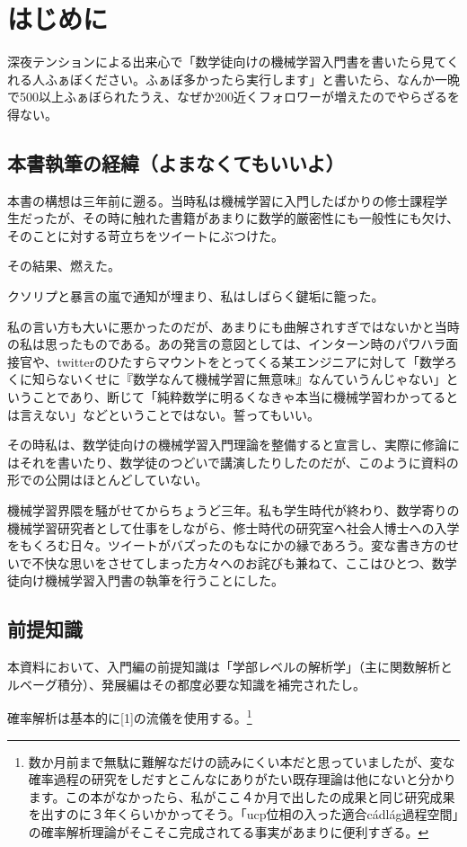 \documentclass{jsarticle}
\begin{document}
\newpage
\section{はじめに}

深夜テンションによる出来心で「数学徒向けの機械学習入門書を書いたら見てくれる人ふぁぼください。ふぁぼ多かったら実行します」と書いたら、なんか一晩で500以上ふぁぼられたうえ、なぜか200近くフォロワーが増えたのでやらざるを得ない。

\subsection{本書執筆の経緯（よまなくてもいいよ）}
本書の構想は三年前に遡る。当時私は機械学習に入門したばかりの修士課程学生だったが、その時に触れた書籍があまりに数学的厳密性にも一般性にも欠け、そのことに対する苛立ちをツイートにぶつけた。

その結果、燃えた。

クソリプと暴言の嵐で通知が埋まり、私はしばらく鍵垢に籠った。

私の言い方も大いに悪かったのだが、あまりにも曲解されすぎではないかと当時の私は思ったものである。あの発言の意図としては、インターン時のパワハラ面接官や、twitterのひたすらマウントをとってくる某エンジニアに対して「数学ろくに知らないくせに『数学なんて機械学習に無意味』なんていうんじゃない」ということであり、断じて「純粋数学に明るくなきゃ本当に機械学習わかってるとは言えない」などということではない。誓ってもいい。

その時私は、数学徒向けの機械学習入門理論を整備すると宣言し、実際に修論にはそれを書いたり、数学徒のつどいで講演したりしたのだが、このように資料の形での公開はほとんどしていない。

機械学習界隈を騒がせてからちょうど三年。私も学生時代が終わり、数学寄りの機械学習研究者として仕事をしながら、修士時代の研究室へ社会人博士への入学をもくろむ日々。ツイートがバズったのもなにかの縁であろう。変な書き方のせいで不快な思いをさせてしまった方々へのお詫びも兼ねて、ここはひとつ、数学徒向け機械学習入門書の執筆を行うことにした。

\subsection{前提知識}
本資料において、入門編の前提知識は「学部レベルの解析学」（主に関数解析とルベーグ積分）、発展編はその都度必要な知識を補完されたし。

確率解析は基本的に[1]の流儀を使用する。\footnote{数か月前まで無駄に難解なだけの読みにくい本だと思っていましたが、変な確率過程の研究をしだすとこんなにありがたい既存理論は他にないと分かります。この本がなかったら、私がここ４か月で出したの成果と同じ研究成果を出すのに３年くらいかかってそう。「ucp位相の入った適合c\'{a}dl\'{a}g過程空間」の確率解析理論がそこそこ完成されてる事実があまりに便利すぎる。}
\end{document}
